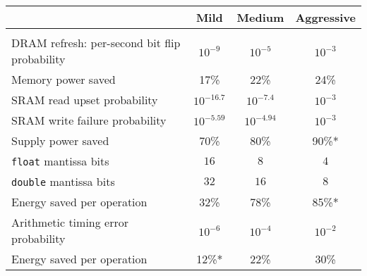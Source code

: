 \begin{tabular}{ p{1.4in} c c c}
 & Mild & Medium & Aggressive \\
\hline \\[-2ex]
DRAM refresh: per-second bit flip probability
& $10^{-9}$ & $10^{-5}$ & $10^{-3}$ \\
Memory power saved
& 17\% & 22\% & 24\% \\[2ex]

SRAM read upset probability
& $10^{-16.7}$ & $10^{-7.4}$ & $10^{-3}$ \\
SRAM write failure probability
& $10^{-5.59}$ & $10^{-4.94}$ & $10^{-3}$ \\
Supply power saved
& 70\% & 80\% & 90\%* \\[2ex]

\texttt{float} mantissa bits
& $16$ & $8$ & $4$ \\
\texttt{double} mantissa bits
& $32$ & $16$ & $8$ \\
Energy saved per operation
& 32\% & 78\% & 85\%* \\[2ex]

Arithmetic timing error probability
& $10^{-6}$ & $10^{-4}$ & $10^{-2}$ \\
Energy saved per operation
& 12\%* & 22\% & 30\% \\
\end{tabular}
